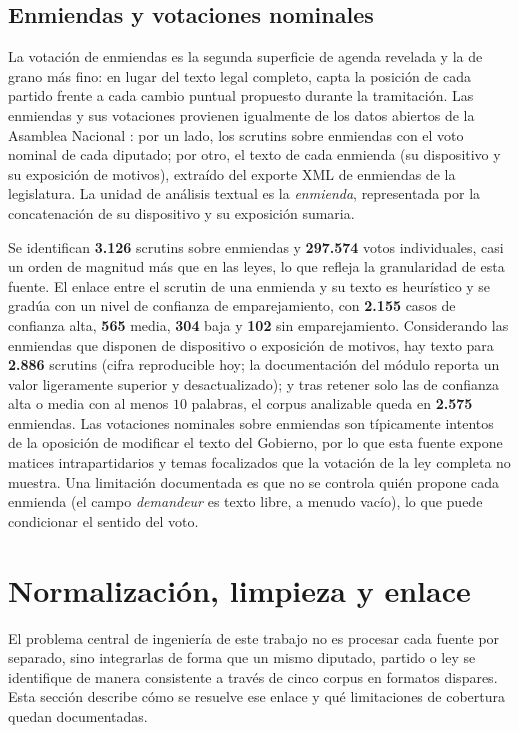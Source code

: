 \subsection{Enmiendas y votaciones nominales}
\label{sec:corpus-enmiendas}

La votación de enmiendas es la segunda superficie de agenda revelada y la de
grano más fino: en lugar del texto legal completo, capta la posición de cada
partido frente a cada cambio puntual propuesto durante la tramitación. Las
enmiendas y sus votaciones provienen igualmente de los datos abiertos de la
Asamblea Nacional \cite{an_opendata_xv}: por un lado, los scrutins sobre
enmiendas con el voto nominal de cada diputado; por otro, el texto de cada
enmienda (su dispositivo y su exposición de motivos), extraído del exporte XML de
enmiendas de la legislatura. La unidad de análisis textual es la \emph{enmienda},
representada por la concatenación de su dispositivo y su exposición sumaria.

Se identifican \textbf{3.126} scrutins sobre enmiendas y \textbf{297.574} votos
individuales, casi un orden de magnitud más que en las leyes, lo que refleja la
granularidad de esta fuente. El enlace entre el scrutin de una enmienda y su
texto es heurístico y se gradúa con un nivel de confianza de emparejamiento, con
\textbf{2.155} casos de confianza alta, \textbf{565} media, \textbf{304} baja y
\textbf{102} sin emparejamiento. Considerando las enmiendas que disponen de
dispositivo o exposición de motivos, hay texto para \textbf{2.886} scrutins
(cifra reproducible hoy; la documentación del módulo reporta un valor
ligeramente superior y desactualizado); y tras retener solo las de confianza
alta o media con al menos $10$ palabras, el corpus analizable queda en
\textbf{2.575} enmiendas.
Las votaciones nominales sobre enmiendas son típicamente intentos de la oposición
de modificar el texto del Gobierno, por lo que esta fuente expone matices
intrapartidarios y temas focalizados que la votación de la ley completa no
muestra. Una limitación documentada es que no se controla quién propone cada
enmienda (el campo \emph{demandeur} es texto libre, a menudo vacío), lo que puede
condicionar el sentido del voto.

\section{Normalización, limpieza y enlace}
\label{sec:normalizacion}

El problema central de ingeniería de este trabajo no es procesar cada fuente por
separado, sino integrarlas de forma que un mismo diputado, partido o ley se
identifique de manera consistente a través de cinco corpus en formatos dispares.
Esta sección describe cómo se resuelve ese enlace y qué limitaciones de cobertura
quedan documentadas.

